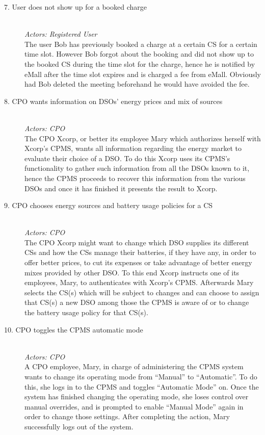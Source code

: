 \documentclass[11pt]{article}
\begin{document}
\begin{description}
    \item [7. User does not show up for a booked charge] \hfill \\
        \textit{Actors: Registered User} \\
        The user Bob has previously booked a charge at a certain CS for a certain time slot. However Bob forgot about the booking and did not show up to the booked CS during the time slot for the charge, hence he is notified by eMall after the time slot expires and is charged a fee from eMall. Obviously had Bob deleted the meeting beforehand he would have avoided the fee.
    \item [8. CPO wants information on DSOs’ energy prices and mix of sources] \hfill \\
        \textit{Actors: CPO} \\
        The CPO Xcorp, or better its employee Mary which authorizes herself with Xcorp's CPMS, wants all information regarding the energy market to evaluate their choice of a DSO. To do this Xcorp uses its CPMS’s functionality to gather such information from all the DSOs known to it, hence the CPMS proceeds to recover this information from the various DSOs and once it has finished it presents the result to Xcorp.
    \item [9. CPO chooses energy sources and battery usage policies for a CS] \hfill \\
        \textit{Actors: CPO} \\
        The CPO Xcorp might want to change which DSO supplies its different CSs and how the CSs manage their batteries, if they have any, in order to offer better prices, to cut its expenses or take advantage of better energy mixes provided by other DSO. To this end Xcorp instructs one of its employees, Mary, to authenticates with Xcorp's CPMS. Afterwards Mary selects the CS(s) which will be subject to changes and can choose to assign that CS(s) a new DSO among those the CPMS is aware of or to change the battery usage policy for that CS(s).
    \item [10. CPO toggles the CPMS automatic mode] \hfill \\
        \textit{Actors: CPO} \\
        A CPO employee, Mary, in charge of administering the CPMS system wants to change its operating mode from “Manual” to “Automatic”. To do this, she logs in to the CPMS and toggles “Automatic Mode” on. Once the system has finished changing the operating mode, she loses control over manual overrides, and is prompted to enable “Manual Mode” again in order to change those settings. After completing the action, Mary successfully logs out of the system. \hfill \\
\end{description}
\end{document}
